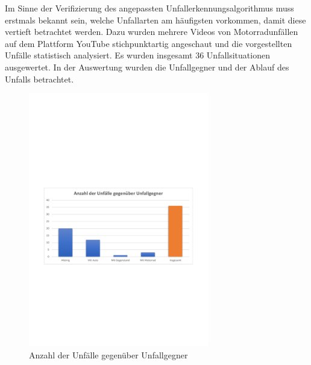 Im Sinne der Verifizierung des angepassten Unfallerkennungsalgorithmus muss erstmals bekannt sein, welche Unfallarten am häu\-figsten vorkommen, damit diese vertieft betrachtet werden. Dazu wurden mehrere Videos von Motorradunfällen auf dem Plattform \glqq YouTube\grqq{} stichpunktartig angeschaut und die vorgestellten Unfälle statistisch analysiert. Es wurden insgesamt $36$ Unfallsituationen ausgewertet. In der Auswertung wurden die Unfallgegner und der Ablauf des Unfalls betrachtet. \citep{YTMotoPassion} %


\begin{figure}[htpb]
	\centering
	\includegraphics[width=0.7\textwidth]{Bilder/youtube_Statistik_Unfallgegner.pdf}
	\caption{Anzahl der Unfälle gegenüber Unfallgegner}
	\label{fig:Youtube_Statistik_Unfallgegner}
\end{figure}


